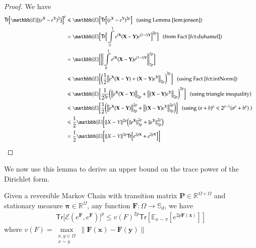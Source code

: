 \begin{proof}
  We have
  \begin{align*}
    \mathsf{Tr}\big[ \mathbb{E}[(e^\mathbf{X}-e^\mathbf{Y})^2]\big]^p&\leq \mathbb{E}\big[\mathsf{Tr}\big[ (e^\mathbf{X}-e^\mathbf{Y})^{2p}\big] \ \ \ \text{(using Lemma \ref{lem:jensen})}\\
    &=\mathbb{E}\big[\mathsf{Tr}\big[ \intop_{0}^{1}e^{t\mathbf{X}}(\mathbf{X}-\mathbf{Y})e^{(1-t)\mathbf{Y}}\big]^{2p}\big] \ \ \ \text{(from Fact \ref{fct:duhamel}) }\\
    &=\mathbb{E}\bigg[\bigg\|\intop_{0}^{1}e^{t\mathbf{X}}(\mathbf{X}-\mathbf{Y})e^{(1-t)\mathbf{Y}}\bigg\|_{2p}^{2p}\bigg]&\\
    &\leq \mathbb{E}\bigg[\bigg(\frac{1}{2}\big\|e^{\mathbf{X}}(\mathbf{X-Y})+(\mathbf{X-Y})e^{\mathbf{Y}}\big\|_{2p}\bigg)^{2p}\bigg] \ \ \ \text{(using Fact \ref{fct:intNorm})}\\
    &\leq \mathbb{E}\bigg[\frac{1}{2^{2p}}\bigg(\big\|e^{\mathbf{X}}(\mathbf{X-Y})\big\|_{2p}+\big\|(\mathbf{X-Y})e^{\mathbf{Y}}\big\|_{2p}\bigg)^{2p}\bigg]\ \ \ \text{(using triangle inequality)}\\
    &\leq \mathbb{E}\bigg[\frac{1}{2}\bigg(\big\|e^{\mathbf{X}}(\mathbf{X-Y})\big\|_{2p}^{2p} + \big\|(\mathbf{X-Y})e^{\mathbf{Y}}\big\|_{2p}^{2p} \bigg)\bigg] \ \ \ \text{(using }(a+b)^p \leq 2^{p-1}(a^p + b^p) \ )\\
    &\leq \frac{1}{2}\mathbb{E}\bigg[\|X-Y\|^{2p}\big(\|e^{\mathbf{X}}\|_{2p}^{2p}+\|e^{\mathbf{Y}}\|_{2p}^{2p}\big)\\
    &=\frac{1}{2}\mathbb{E}\bigg[\|X-Y\|^{2p}\mathsf{Tr}\big[e^{2p\mathbf{X}}+e^{2p\mathbf{Y}}\big]\bigg]
  \end{align*}
\end{proof}
We now use this lemma to derive an upper bound on the trace power of the Dirichlet form.
\begin{lemma}\label{lem:dirichlet} Given a reversible Markov Chain with transition matrix $\mathbf{P}\in\mathbb{R}^{\Omega\times \Omega}$ and stationary measure $\mathbf{\pi}\in\mathbb{R}^{\Omega}$, any function $\mathbf{F} : \Omega \rightarrow \mathbb{S}_d$, we have
  \begin{align*}
    \mathsf{Tr}\big[\mathcal{E}(e^\mathbf{F}, e^\mathbf{F})\big]^p \leq v(F)^{2p} \mathsf{Tr}[\mathbb{E}_{x \sim \pi}[e^{2p\mathbf{F(x)}}]]
  \end{align*}
  where $v(F) = \max\limits_{\substack{x,y\in\Omega\\x\sim y}}\|\mathbf{F(x)}-\mathbf{F(y)}\|$
\end{lemma}
